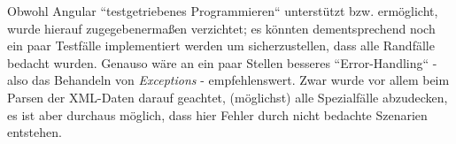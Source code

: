 Obwohl Angular ``testgetriebenes Programmieren`` unterstützt bzw. ermöglicht, wurde hierauf  zugegebenermaßen verzichtet; es könnten dementsprechend noch ein paar Testfälle implementiert werden um sicherzustellen, dass alle Randfälle bedacht wurden. Genauso wäre an ein paar Stellen besseres ``Error-Handling`` - also das Behandeln von \textit{Exceptions} - empfehlenswert. Zwar wurde vor allem beim Parsen der \acs{XML}-Daten darauf geachtet, (möglichst) alle Spezialfälle abzudecken, es ist aber durchaus möglich, dass hier Fehler durch nicht bedachte Szenarien entstehen.





